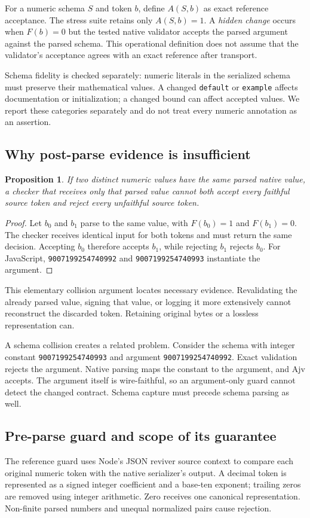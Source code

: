 \documentclass[11pt]{article}
\newtheorem{proposition}{Proposition}
\begin{document}
For a numeric schema $S$ and token $b$, define $A(S,b)$ as exact reference acceptance. The stress suite retains only $A(S,b)=1$. A \emph{hidden change} occurs when $F(b)=0$ but the tested native validator accepts the parsed argument against the parsed schema. This operational definition does not assume that the validator's acceptance agrees with an exact reference after transport.

Schema fidelity is checked separately: numeric literals in the serialized schema must preserve their mathematical values. A changed \texttt{default} or \texttt{example} affects documentation or initialization; a changed bound can affect accepted values. We report these categories separately and do not treat every numeric annotation as an assertion.

\subsection{Why post-parse evidence is insufficient}
\begin{proposition}\label{prop:collision}
If two distinct numeric values have the same parsed native value, a checker that receives only that parsed value cannot both accept every faithful source token and reject every unfaithful source token.
\end{proposition}
\begin{proof}
Let $b_0$ and $b_1$ parse to the same value, with $F(b_0)=1$ and $F(b_1)=0$. The checker receives identical input for both tokens and must return the same decision. Accepting $b_0$ therefore accepts $b_1$, while rejecting $b_1$ rejects $b_0$. For JavaScript, \texttt{9007199254740992} and \texttt{9007199254740993} instantiate the argument.
\end{proof}
This elementary collision argument locates necessary evidence. Revalidating the already parsed value, signing that value, or logging it more extensively cannot reconstruct the discarded token. Retaining original bytes or a lossless representation can.

A schema collision creates a related problem. Consider the schema with integer constant \texttt{9007199254740993} and argument \texttt{9007199254740992}. Exact validation rejects the argument. Native parsing maps the constant to the argument, and Ajv accepts. The argument itself is wire-faithful, so an argument-only guard cannot detect the changed contract. Schema capture must precede schema parsing as well.

\subsection{Pre-parse guard and scope of its guarantee}
The reference guard uses Node's JSON reviver source context to compare each original numeric token with the native serializer's output. A decimal token is represented as a signed integer coefficient and a base-ten exponent; trailing zeros are removed using integer arithmetic. Zero receives one canonical representation. Non-finite parsed numbers and unequal normalized pairs cause rejection.
\end{document}
